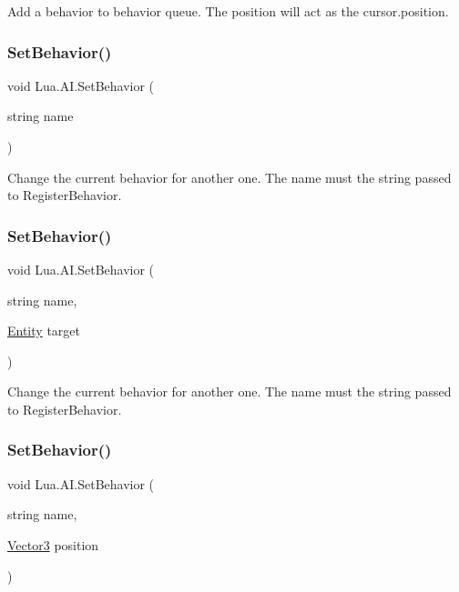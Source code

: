 Add a behavior to behavior queue. The position will act as the cursor.\+position. 

\mbox{\label{class_lua_1_1_a_i_a2ab87c868530bf4f91fb44374cd58337}} 
\subsubsection{\texorpdfstring{SetBehavior()}{SetBehavior()}\hspace{0.1cm}{\footnotesize\ttfamily [1/3]}}
{\footnotesize\ttfamily void Lua.\+A\+I.\+Set\+Behavior (\begin{DoxyParamCaption}\item[{string}]{name }\end{DoxyParamCaption})}



Change the current behavior for another one. The name must the string passed to Register\+Behavior. 

\mbox{\label{class_lua_1_1_a_i_a9555e89507ac0b07384beab7238dc419}} 
\subsubsection{\texorpdfstring{SetBehavior()}{SetBehavior()}\hspace{0.1cm}{\footnotesize\ttfamily [2/3]}}
{\footnotesize\ttfamily void Lua.\+A\+I.\+Set\+Behavior (\begin{DoxyParamCaption}\item[{string}]{name,  }\item[{\mbox{\hyperlink{class_lua_1_1_entity}{Entity}}}]{target }\end{DoxyParamCaption})}



Change the current behavior for another one. The name must the string passed to Register\+Behavior. 

\mbox{\label{class_lua_1_1_a_i_a7e50aee44b076aa5c37535dcc55b2c55}} 
\subsubsection{\texorpdfstring{SetBehavior()}{SetBehavior()}\hspace{0.1cm}{\footnotesize\ttfamily [3/3]}}
{\footnotesize\ttfamily void Lua.\+A\+I.\+Set\+Behavior (\begin{DoxyParamCaption}\item[{string}]{name,  }\item[{\mbox{\hyperlink{class_lua_1_1_vector3}{Vector3}}}]{position }\end{DoxyParamCaption})}




